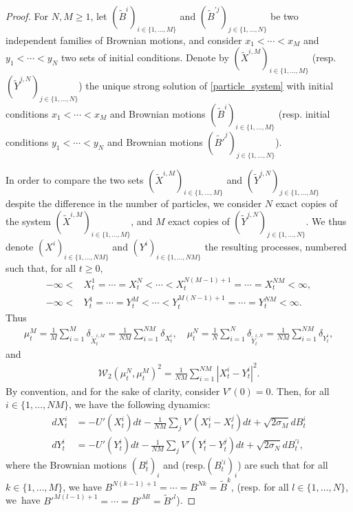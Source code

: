 \documentclass[11pt]{article}
\newcommand{\resp}{resp.\xspace}
\theoremstyle{plain}
\theoremstyle{definition}
\begin{document}
\begin{proof}
For $N,M\geq1$, let $(\tilde{B}^i)_{i\in\{1,\dots,M\}}$ and $(\tilde{B}^{\prime j})_{j\in\{1,\dots,N\}}$ be two independent families of Brownian motions, and consider $x_1<\cdots<x_M$ and $y_1<\cdots<y_N$ two sets of initial conditions. Denote by $(\tilde{X}^{i,M})_{i\in\{1,\dots,M\}}$ (\resp $(\tilde{Y}^{j,N})_{j\in\{1,\dots,N\}}$) the unique strong solution of \eqref{particle_system} with initial conditions $x_1<\cdots<x_M$ and Brownian motions $(\tilde{B}^i)_{i\in\{1,\dots,M\}}$ (\resp initial conditions $y_1<\cdots<y_N$ and Brownian motions $(\tilde{B'}^j)_{j\in\{1,\dots,N\}}$).

In order to compare the two sets $(\tilde{X}^{i,M})_{i\in\{1,\dots,M\}}$ and $(\tilde{Y}^{j,N})_{j\in\{1,\dots,M\}}$ despite the difference in the number of particles, we consider $N$ exact copies of the system $(\tilde{X}^{i,M})_{i\in\{1,\dots,M\}}$, and $M$ exact copies of $(\tilde{Y}^{j,N})_{j\in\{1,\dots,N\}}$. We thus denote $(X^{i})_{i\in\{1,\dots,NM\}}$ and $(Y^{i})_{i\in\{1,\dots,NM\}}$ the resulting processes, numbered such that, for all $t\geq0$,
\begin{align*}
-\infty<&X^1_t=\cdots=X^N_t<\cdots<X^{N(M-1)+1}_t=\cdots=X^{NM}_t<\infty,\\
-\infty<&Y^1_t=\cdots=Y^M_t<\cdots<Y^{M(N-1)+1}_t=\cdots=Y^{NM}_t<\infty.
\end{align*}
Thus
\begin{align*}
\mu^M_t=\frac{1}{M}\sum_{i=1}^M\delta_{\tilde{X}^{i,M}_t}=\frac{1}{NM}\sum_{i=1}^{NM}\delta_{X^{i}_t},\quad \mu^N_t=\frac{1}{N}\sum_{i=1}^N\delta_{\tilde{Y}^{i,N}_t}=\frac{1}{NM}\sum_{i=1}^{NM}\delta_{Y^{i}_t},
\end{align*}
and
\begin{align*}
\mathcal{W}_2\left(\mu_t^N,\mu_t^M\right)^2=\frac{1}{NM}\sum_{i=1}^{NM}\left|X^i_t-Y^i_t\right|^2.
\end{align*}
By convention, and for the sake of clarity, consider $V'(0)=0$. Then, for all $i\in\{1,\dots,NM\}$, we have the following dynamics:
\begin{align*}
dX^i_t&=-U'( X^i_t)dt-\frac{1}{NM}\sum_{j}V'(X^i_t-X^j_t)dt+\sqrt{2\sigma_M}dB^{i}_t\\
dY^i_t&=-U'( Y^i_t)dt-\frac{1}{NM}\sum_{j}V'(Y^i_t-Y^j_t)dt+\sqrt{2\sigma_N}dB^{\prime i}_t,
\end{align*}
where the Brownian motions $(B^{i}_t)_i$ and (\resp $(B^{\prime i}_t)_i$) are such that for all $k\in\{1,\dots,M\}$, we have ${B^{N(k-1)+1}=\cdots=B^{Nk}=\tilde{B}^{k}}$, (\resp for all $l\in\{1,\dots,N\}$, we~have ${B'^{M(l-1)+1}=\cdots=B'^{Ml}=\tilde{B}'^{l}}$).

\end{proof}
\end{document}
